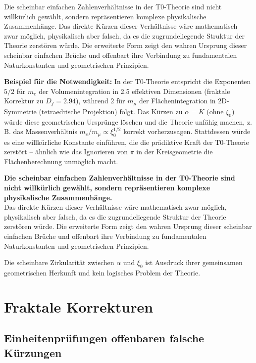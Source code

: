 \documentclass[12pt,a4paper]{article}
\newcommand{\xipar}{\xi_0}
\newcommand{\Dfrak}{D_f}
\begin{document}
	Die scheinbar einfachen Zahlenverhältnisse in der T0-Theorie sind nicht willkürlich gewählt, sondern repräsentieren komplexe physikalische Zusammenhänge. Das direkte Kürzen dieser Verhältnisse wäre mathematisch zwar möglich, physikalisch aber falsch, da es die zugrundeliegende Struktur der Theorie zerstören würde. Die erweiterte Form zeigt den wahren Ursprung dieser scheinbar einfachen Brüche und offenbart ihre Verbindung zu fundamentalen Naturkonstanten und geometrischen Prinzipien.
	
	\textbf{Beispiel für die Notwendigkeit:} In der T0-Theorie entspricht die Exponenten $5/2$ für $m_e$ der Volumenintegration in 2.5 effektiven Dimensionen (fraktale Korrektur zu $\Dfrak = 2.94$), während $2$ für $m_\mu$ der Flächenintegration in 2D-Symmetrie (tetraedrische Projektion) folgt. Das Kürzen zu $\alpha = K$ (ohne $\xipar$) würde diese geometrischen Ursprünge löschen und die Theorie unfähig machen, z. B. das Massenverhältnis $m_e/m_\mu \propto \xipar^{1/2}$ korrekt vorherzusagen. Stattdessen würde es eine willkürliche Konstante einführen, die die prädiktive Kraft der T0-Theorie zerstört – ähnlich wie das Ignorieren von $\pi$ in der Kreisgeometrie die Flächenberechnung unmöglich macht.
	
	\begin{tcolorbox}[colback=blue!5!white,colframe=blue!75!black,title=Schlüsselergebnis]
		\textbf{Die scheinbar einfachen Zahlenverhältnisse in der T0-Theorie sind nicht willkürlich gewählt, sondern repräsentieren komplexe physikalische Zusammenhänge.} \\
		
		Das direkte Kürzen dieser Verhältnisse wäre mathematisch zwar möglich, physikalisch aber falsch, da es die zugrundeliegende Struktur der Theorie zerstören würde. Die erweiterte Form zeigt den wahren Ursprung dieser scheinbar einfachen Brüche und offenbart ihre Verbindung zu fundamentalen Naturkonstanten und geometrischen Prinzipien.
		
		Die scheinbare Zirkularität zwischen $\alpha$ und $\xipar$ ist Ausdruck ihrer gemeinsamen geometrischen Herkunft und kein logisches Problem der Theorie.
	\end{tcolorbox}
	\section{Fraktale Korrekturen}
	\subsection{Einheitenprüfungen offenbaren falsche Kürzungen}
	
\end{document}
